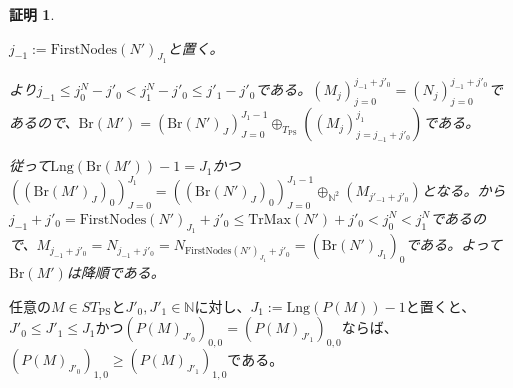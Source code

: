 \documentclass[dvipdfmx,uplatex]{jsarticle}
\theoremstyle{customnonumberbreakfortheorem}
\theoremstyle{customnonumberbreakforproof}
\newtheorem{hideableproof}{証明}
\begin{document}
\begin{hideableproof}
\begin{indented}
\begin{indented}
\begin{indented}
\begin{indented}
\begin{indented}
\begin{indented}
							\begin{indented}
								\item \(j_{-1} := \textrm{FirstNodes}(N')_{J_1}\)と置く。
								\item {}より\(j_{-1} \leq j_0^N-j'_0 < j_1^N-j'_0 \leq j'_1-j'_0\)である。\((M_j)_{j=0}^{j_{-1}+j'_0} = (N_j)_{j=0}^{j_{-1}+j'_0}\)であるので、\(\textrm{Br}(M') = (\textrm{Br}(N')_J)_{J=0}^{J_1-1} \oplus_{T_{\textrm{PS}}} ((M_j)_{j=j_{-1}+j'_0}^{j_1})\)である。
								\item 従って\(\textrm{Lng}(\textrm{Br}(M'))-1 = J_1\)かつ\(((\textrm{Br}(M')_J)_0)_{J=0}^{J_1} = ((\textrm{Br}(N')_J)_0)_{J=0}^{J_1-1} \oplus_{\mathbb{N}^2} (M_{j'_{-1}+j'_0})\)となる。から\(j_{-1}+j'_0 = \textrm{FirstNodes}(N')_{J_1}+j'_0 \leq \textrm{TrMax}(N')+j'_0 < j_0^N < j_1^N\)であるので、\(M_{j_{-1}+j'_0} = N_{j_{-1}+j'_0} = N_{\textrm{FirstNodes}(N')_{J_1}+j'_0} = (\textrm{Br}(N')_{J_1})_0\)である。よって\(\textrm{Br}(M')\)は降順である。
							\end{indented}
						\end{indented}
					\end{indented}
				\end{indented}
			\end{indented}
		\end{indented}
	\end{indented}
\end{hideableproof}

\begin{proposition}[標準形の単項成分が降順であること]\label{標準形の単項成分が降順であること}
	任意の\(M \in ST_{\textrm{PS}}\)と\(J'_0,J'_1 \in \mathbb{N}\)に対し、\(J_1 := \textrm{Lng}(P(M))-1\)と置くと、\(J'_0 \leq J'_1 \leq J_1\)かつ\((P(M)_{J'_0})_{0,0} = (P(M)_{J'_1})_{0,0}\)ならば、\((P(M)_{J'_0})_{1,0} \geq (P(M)_{J'_1})_{1,0}\)である。
\end{proposition}
\end{document}
